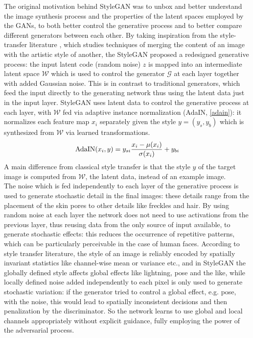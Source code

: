\documentclass[conference]{IEEEtran}
\begin{document}
The original motivation behind StyleGAN was to unbox and better understand the image synthesis process and the properties of the latent spaces employed by the GANs, to both better control the generative process and to better compare different generators between each other. By taking inspiration from the style-transfer literature \cite{styletransfer}, which studies techniques of merging the content of an image with the artistic style of another, the StyleGAN proposed a redesigned generative process: the input latent code (random noise) $z$ is mapped into an intermediate latent space $\mathcal{W}$ which is used to control the generator $\mathcal{G}$ at each layer together with added Gaussian noise. This is in contrast to traditional generators, which feed the input directly to the generating network thus using the latent data just in the input layer. StyleGAN uses latent data to control the generative process at each layer, with $\mathcal{W}$ fed via adaptive instance normalization (AdaIN, \eqref{adain}): it normalizes each feature map $x_i$ separately given the style $y = (y_s, y_b)$ which is synthesized from $\mathcal{W}$ via learned transformations.
\begin{equation}
\hbox{AdaIN}(x_i, y) = y_{si}\frac{x_i-\mu(x_i)}{\sigma(x_i)} + y_{bi}
\label{adain}
\end{equation} 
A main difference from classical style transfer \cite{styletransfer} is that the style $y$ of the target image is computed from $\mathcal{W}$, the latent data, instead of an example image.\\
The noise which is fed independently to each layer of the generative process is used to generate stochastic detail in the final images: these details range from the placement of the skin pores to other details like freckles and hair. By using random noise at each layer the network does not need to use activations from the previous layer, thus reusing data from the only source of input available, to generate stochastic effects: this reduces the occurrence of repetitive patterns, which can be particularly perceivable in the case of human faces. According to style transfer literature, the style of an image is reliably encoded by spatially invariant statistics like channel-wise mean or variance etc., and in StyleGAN the globally defined style affects global effects like lightning, pose and the like, while locally defined noise added independently to each pixel is only used to generate stochastic variation: if the generator tried to control a global effect, e.g. pose, with the noise, this would lead to spatially inconsistent decisions and then penalization by the discriminator. So the network learns to use global and local channels appropriately without explicit guidance, fully employing the power of the adversarial process.\\
\end{document}
